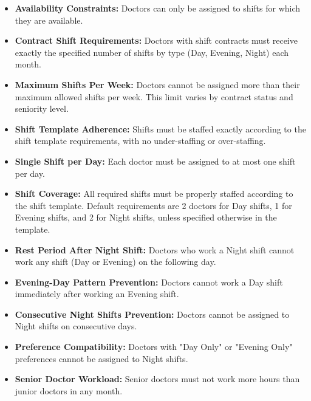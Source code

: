 \documentclass[12pt]{article}
\begin{document}
\begin{itemize}
    \item \textbf{Availability Constraints:} Doctors can only be assigned to shifts for which they are available.

    \item \textbf{Contract Shift Requirements:} Doctors with shift contracts must receive exactly the specified number of shifts by type (Day, Evening, Night) each month.
    
    \item \textbf{Maximum Shifts Per Week:} Doctors cannot be assigned more than their maximum allowed shifts per week. This limit varies by contract status and seniority level.
    
    \item \textbf{Shift Template Adherence:} Shifts must be staffed exactly according to the shift template requirements, with no under-staffing or over-staffing.
    
    \item \textbf{Single Shift per Day:} Each doctor must be assigned to at most one shift per day.
    
    \item \textbf{Shift Coverage:} All required shifts must be properly staffed according to the shift template. Default requirements are 2 doctors for Day shifts, 1 for Evening shifts, and 2 for Night shifts, unless specified otherwise in the template.
    
    \item \textbf{Rest Period After Night Shift:} Doctors who work a Night shift cannot work any shift (Day or Evening) on the following day.
    
    \item \textbf{Evening-Day Pattern Prevention:} Doctors cannot work a Day shift immediately after working an Evening shift.
    
    \item \textbf{Consecutive Night Shifts Prevention:} Doctors cannot be assigned to Night shifts on consecutive days.
    
    \item \textbf{Preference Compatibility:} Doctors with "Day Only" or "Evening Only" preferences cannot be assigned to Night shifts.
    
    \item \textbf{Senior Doctor Workload:} Senior doctors must not work more hours than junior doctors in any month.
    

\end{itemize}
\end{document}
